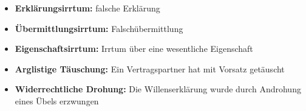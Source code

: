 \begin{itemize}
	\item \textbf{Erklärungsirrtum:} falsche Erklärung
	\item \textbf{Übermittlungsirrtum:} Falschübermittlung
	\item \textbf{Eigenschaftsirrtum:} Irrtum über eine wesentliche Eigenschaft
	\item \textbf{Arglistige Täuschung:} Ein Vertragspartner hat mit Vorsatz getäuscht
	\item \textbf{Widerrechtliche Drohung:}\newline
	Die Willenserklärung wurde durch Androhung eines Übels erzwungen
\end{itemize}

